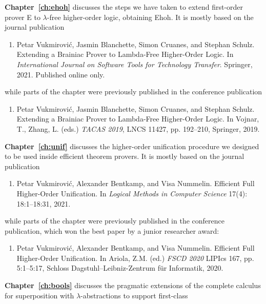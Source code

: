 \vspace{0.5em}
\noindent\textbf{Chapter~\ref{ch:ehoh}} discusses the steps we have taken to extend first-order
  prover E to $\lambda$-free higher-order logic, obtaining Ehoh. It is mostly based on the journal publication
  \begin{enumerate}
    \item Petar Vukmirović, Jasmin Blanchette, Simon Cruanes, and Stephan Schulz.
    Extending a Brainiac Prover to Lambda-Free Higher-Order Logic.
    In \emph{International Journal on Software Tools for Technology Transfer}. Springer, 2021. Published online only.
  \end{enumerate}
\vspace{-0.3em}
while parts of the chapter were previously published in the conference publication
\vspace{-0.3em}
  \begin{enumerate}[resume]
    \item Petar Vukmirović, Jasmin Blanchette, Simon Cruanes, and Stephan Schulz.
    Extending a Brainiac Prover to Lambda-Free Higher-Order Logic.
    In Vojnar, T., Zhang, L. (eds.) \emph{TACAS 2019}, LNCS 11427, pp. 192--210, Springer, 2019.
  \end{enumerate}
\noindent\textbf{Chapter~\ref{ch:unif}} discusses the higher-order unification procedure we designed to be used
inside efficient theorem provers. It is mostly based on the journal publication
  \begin{enumerate}[resume]
    \item Petar Vukmirović, Alexander Bentkamp, and Visa Nummelin. Efficient Full Hi\-gher-Order Unification. 
    In \emph{Logical Methods in Computer Science} 17(4): 18:1--18:31, 2021.
  \end{enumerate}
\vspace{-0.3em}
while parts of the chapter were previously published in the conference
publication, which won the best paper by a junior researcher award:
\vspace{-0.3em}
\begin{enumerate}[resume]
  \item Petar Vukmirović, Alexander Bentkamp, and Visa Nummelin. Efficient Full Hi\-gher-Order Unification. 
  In Ariola, Z.M. (ed.) \emph{FSCD 2020} LIPIcs 167, pp. 5:1--5:17, Schloss Dagstuhl--Leibniz-Zentrum für Informatik, 2020. 
\end{enumerate}
\noindent\textbf{Chapter~\ref{ch:bools}} discusses the pragmatic extensions of
the complete calculus for superposition with $\lambda$-abstractions to support first-class
